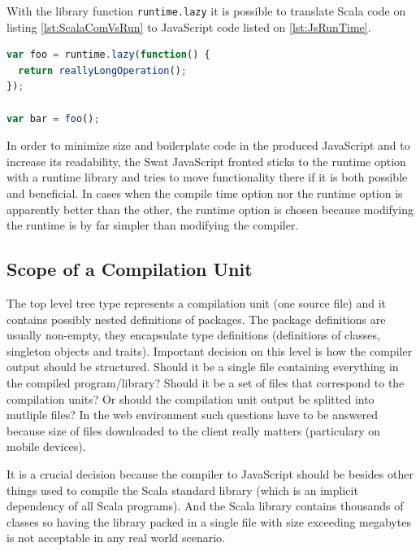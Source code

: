 \documentclass[12pt,a4paper]{report}
\begin{document}
With the library function \texttt{runtime.lazy} it is possible to translate Scala code on listing \ref{lst:ScalaComVsRun} to JavaScript code listed on \ref{lst:JsRunTime}.

\begin{minipage}{\linewidth}
\begin{lstlisting}[language=JavaScript,caption={Runtime option outcome.},label={lst:JsRunTime}]
var foo = runtime.lazy(function() {
  return reallyLongOperation();
});

var bar = foo();
\end{lstlisting}
\end{minipage}

In order to minimize size and boilerplate code in the produced JavaScript and to increase its readability, the Swat JavaScript fronted sticks to the runtime option with a runtime library and tries to move functionality there if it is both possible and beneficial. In cases when the compile time option nor the runtime option is apparently better than the other, the runtime option is chosen because modifying the runtime is by far simpler than modifying the compiler.

\subsection{Scope of a Compilation Unit}

The top level tree type represents a compilation unit (one source file) and it contains possibly nested definitions of packages. The package definitions are usually non-empty, they encapsulate type definitions (definitions of classes, singleton objects and traits). Important decision on this level is how the compiler output should be structured. Should it be a single file containing everything in the compiled program/library? Should it be a set of files that correspond to the compilation units? Or should the compilation unit output be splitted into mutliple files? In the web environment such questions have to be answered because size of files downloaded to the client really matters (particulary on mobile devices).

It is a crucial decision because the compiler to JavaScript should be besides other things used to compile the Scala standard library \cite{ScalaLibrary} (which is an implicit dependency of all Scala programs). And the Scala library contains thousands of classes so having the library packed in a single file with size exceeding megabytes is not acceptable in any real world scenario.
\end{document}
